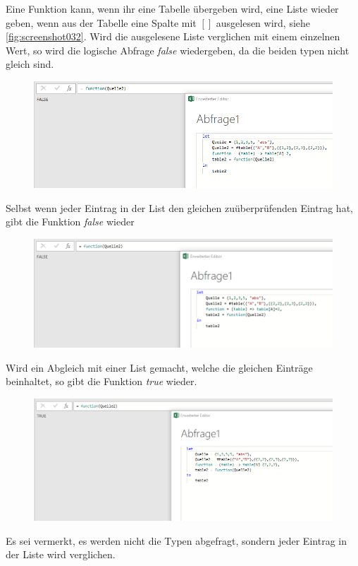 Eine Funktion kann, wenn ihr eine Tabelle übergeben wird, eine Liste wieder geben, wenn aus der Tabelle eine Spalte mit $[]$ ausgelesen wird, siehe \ref{fig:screenshot032}. Wird die ausgelesene Liste verglichen mit einem einzelnen Wert, so wird die logische Abfrage \textit{false} wiedergeben, da die beiden typen nicht gleich sind.

\begin{figure}[H]
	\centering
	\includegraphics[scale = 0.3]{attachment/chapter_1/screenshot043}
	\caption{}
	\label{fig:screenshot043}
\end{figure}
Selbst wenn jeder Eintrag in der List den gleichen zuüberprüfenden Eintrag hat, gibt die Funktion \textit{false} wieder

\begin{figure}[H]
	\centering
	\includegraphics[scale = 0.3]{attachment/chapter_1/screenshot036}
	\caption{}
	\label{fig:screenshot036}
\end{figure}
Wird ein Abgleich mit einer List gemacht, welche die gleichen Einträge beinhaltet, so gibt die Funktion \textit{true} wieder.

\begin{figure}[H]
	\centering
	\includegraphics[scale = 0.3]{attachment/chapter_1/screenshot037}
	\caption{}
	\label{fig:screenshot037}
\end{figure}
Es sei vermerkt, es werden nicht die Typen abgefragt, sondern jeder Eintrag in der Liste wird verglichen.

